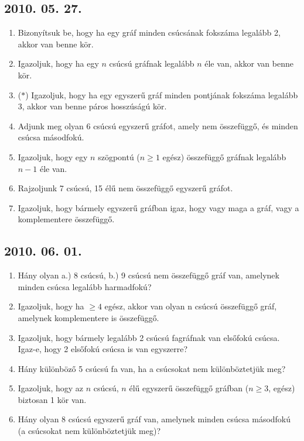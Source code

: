 \documentclass{article}
\begin{document}
\subsection*{2010. 05. 27.}
\begin{enumerate}
\item Bizonyítsuk be, hogy ha egy gráf minden csúcsának fokszáma legalább 2, akkor van benne kör.
\item Igazoljuk, hogy ha egy $n$ csúcsú gráfnak legalább $n$ éle van, akkor van benne kör.
\item ($*$) Igazoljuk, hogy ha egy egyszerű gráf minden pontjának fokszáma legalább 3, akkor van benne páros hosszúságú kör.
\item Adjunk meg olyan 6 csúcsú egyszerű gráfot, amely nem összefüggő, és minden csúcsa másodfokú.
\item Igazoljuk, hogy egy $n$ szögpontú ($n\geq 1$ egész) összefüggő gráfnak legalább $n-1$ éle van.
\item Rajzoljunk 7 csúcsú, 15 élű nem összefüggő egyszerű gráfot.
\item Igazoljuk, hogy bármely egyszerű gráfban igaz, hogy vagy maga a gráf, vagy a komplementere összefüggő.
\end{enumerate}


\subsection*{2010. 06. 01.}
\begin{enumerate}
\item Hány olyan a.) 8 csúcsú, b.) 9 csúcsú nem összefüggő gráf van, amelynek minden csúcsa legalább harmadfokú?
\item Igazoljuk, hogy ha $\geq 4$ egész, akkor van olyan n csúcsú összefüggő gráf, amelynek komplementere is összefüggő.
\item Igazoljuk, hogy bármely legalább 2 csúcsú fagráfnak van elsőfokú csúcsa. Igaz-e, hogy 2 elsőfokú csúcsa is van egyszerre?
\item Hány különböző 5 csúcsú fa van, ha a csúcsokat nem különböztetjük meg?
\item Igazoljuk, hogy az $n$ csúcsú, $n$ élű egyszerű összefüggő gráfban ($n\geq 3$, egész) biztosan 1 kör van.
\item Hány olyan 8 csúcsú egyszerű gráf van, amelynek minden csúcsa másodfokú (a csúcsokat nem különböztetjük meg)?
\end{enumerate}
\end{document}
